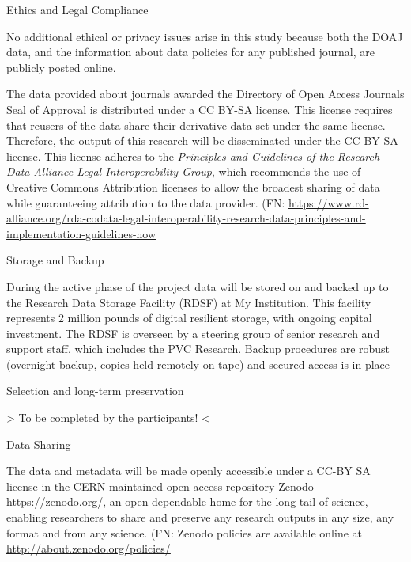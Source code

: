 \documentclass[ignorenonframetext,]{beamer}
\begin{document}
\begin{frame}

Ethics and Legal Compliance

No additional ethical or privacy issues arise in this study because both
the DOAJ data, and the information about data policies for any published
journal, are publicly posted online.

The data provided about journals awarded the Directory of Open Access
Journals Seal of Approval is distributed under a CC BY-SA license. This
license requires that reusers of the data share their derivative data
set under the same license. Therefore, the output of this research will
be disseminated under the CC BY-SA license. This license adheres to the
\emph{Principles and Guidelines of the Research Data Alliance Legal
Interoperability Group}, which recommends the use of Creative Commons
Attribution licenses to allow the broadest sharing of data while
guaranteeing attribution to the data provider. (FN:
\url{https://www.rd-alliance.org/rda-codata-legal-interoperability-research-data-principles-and-implementation-guidelines-now}

\end{frame}

\begin{frame}

Storage and Backup

During the active phase of the project data will be stored on and backed
up to the Research Data Storage Facility (RDSF) at My Institution. This
facility represents 2 million pounds of digital resilient storage, with
ongoing capital investment. The RDSF is overseen by a steering group of
senior research and support staff, which includes the PVC Research.
Backup procedures are robust (overnight backup, copies held remotely on
tape) and secured access is in place

\end{frame}

\begin{frame}

Selection and long-term preservation

\textbar{}\textbar{}\textgreater{} To be completed by the participants!
\textless{}\textbar{}\textbar{}

\end{frame}

\begin{frame}

Data Sharing

The data and metadata will be made openly accessible under a CC-BY SA
license in the CERN-maintained open access repository Zenodo
\url{https://zenodo.org/}, an open dependable home for the long-tail of
science, enabling researchers to share and preserve any research outputs
in any size, any format and from any science. (FN: Zenodo policies are
available online at \url{http://about.zenodo.org/policies/}

\end{frame}
\end{document}
